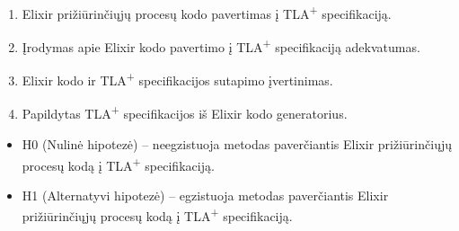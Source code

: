 \documentclass{VUMIFPSmagistrinis}
\begin{document}
		\begin{enumerate}
			\item{Elixir prižiūrinčiųjų procesų kodo pavertimas į TLA\textsuperscript{+} specifikaciją.}
			\item{Įrodymas apie Elixir kodo pavertimo į TLA\textsuperscript{+} specifikaciją adekvatumas.}
			\item{Elixir kodo ir TLA\textsuperscript{+} specifikacijos sutapimo įvertinimas.}
			\item{Papildytas TLA\textsuperscript{+} specifikacijos iš Elixir kodo generatorius.}
		\end{enumerate}

		\begin{itemize}
			\item H0 (Nulinė hipotezė) -- neegzistuoja metodas paverčiantis Elixir prižiūrinčiųjų procesų kodą į TLA\textsuperscript{+} specifikaciją.
			\item H1 (Alternatyvi hipotezė) -- egzistuoja metodas paverčiantis Elixir prižiūrinčiųjų procesų kodą į TLA\textsuperscript{+} specifikaciją.
		\end{itemize}
		
	\pagebreak
	\printbibliography[heading=bibintoc] 
\end{document}
